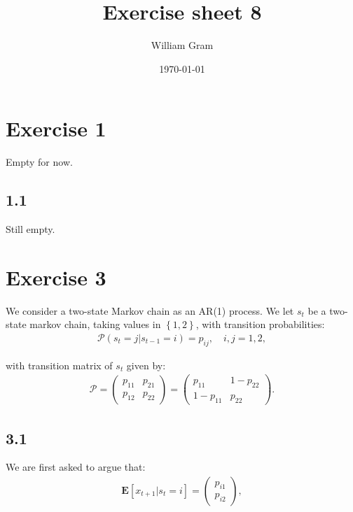 \documentclass[11pt,a4paper,oneside]{article}
\title{Exercise sheet 8}
\author{William Gram}
\date{\today}
\newcommand{\lp}{\left(}
\newcommand{\rp}{\right)}
\newcommand{\rb}{\right]}
\newcommand{\lb}{\left[}
\newcommand{\lc}{\left\{}
\newcommand{\rc}{\right\}}
\newcommand{\ee}{\mathbf{E}}
\newcommand{\pp}{\mathcal{P}}
\begin{document}
\maketitle

\rfoot{\thepage}

\section{Exercise 1}
\renewcommand{\theequation}{1.\arabic{equation}}
\setcounter{equation}{0}
Empty for now.
\subsection{1.1}
Still empty.

\clearpage
\section{Exercise 3}
\renewcommand{\theequation}{3.\arabic{equation}}
\setcounter{equation}{0}

We consider a two-state Markov chain as an AR(1) process. We let $s_t$ be a two-state markov chain, taking values in $\lc 1, 2\rc$, with transition probabilities:
\begin{align}
    \pp\lp s_t = j\vert s_{t-1} = i\rp = p_{ij}, \quad i, j = 1, 2,
\end{align}

with transition matrix of $s_t$ given by:
\begin{align}
    \pp = 
        \begin{pmatrix}
            p_{11} & p_{21} \\
            p_{12} & p_{22} 
        \end{pmatrix}
        =
        \begin{pmatrix}
            p_{11} & 1 - p_{22} \\
            1 - p_{11} & p_{22}
        \end{pmatrix}.
\end{align}

\subsection{3.1}
We are first asked to argue that:
\begin{align}
    \ee\lb x_{t+1} \vert s_t = i\rb 
        =
        \begin{pmatrix}
            p_{i1}\\
            p_{i2}
        \end{pmatrix},
\end{align}
\end{document}
